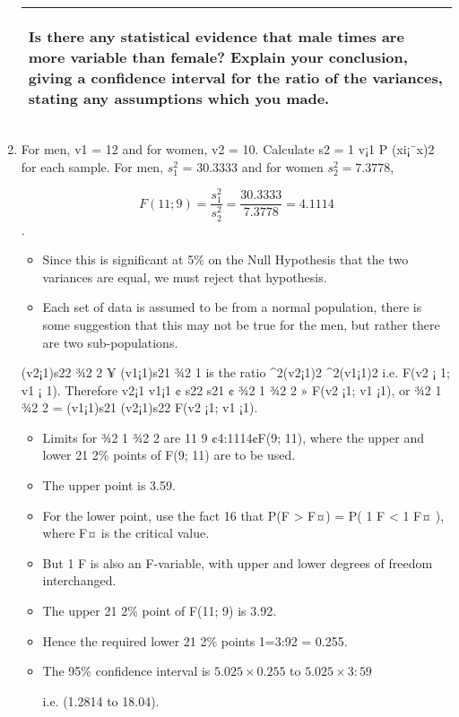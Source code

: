 \documentclass[a4paper,12pt]{article}
\begin{document}
\begin{enumerate}
\begin{table}[ht!]
\begin{tabular}{|p{15cm}|}
\begin{center}
\end{center}
Is there any statistical evidence that male times are more variable than female? Explain
your conclusion, giving a confidence interval for the ratio of the variances, stating any
assumptions which you made.
\\ \hline
      
\end{tabular}
    
\end{table}
\item  For men, v1 = 12 and for women, v2 = 10. Calculate s2 = 1
v¡1
P
(xi¡¯x)2 for
each sample. For men, $s^2_1$
= 30.3333 and for women $s^2_2
= 7.3778$, 

\[ F(11;9) = \frac{s^2_1}{s^2_2}  = \frac{30.3333}{7.3778} 
= 4.1114\]. 

\begin{itemize}
    \item Since this is significant at 5\% on the Null Hypothesis that the
two variances are equal, we must reject that hypothesis.
\item Each set of data is
assumed to be from a normal population, there is some suggestion that this
may not be true for the men, but rather there are two sub-populations.
\end{itemize}

(v2¡1)s22 ¾2
2
¥ (v1¡1)s21
¾2
1
is the ratio \chi^2(v2¡1)2
\chi^2(v1¡1)2
i.e. F(v2 ¡ 1; v1 ¡ 1). Therefore
v2¡1
v1¡1 ¢ s22
s21
¢ ¾2
1
¾2
2
» F(v2 ¡1; v1 ¡1), or ¾2
1
¾2
2
= (v1¡1)s21
(v2¡1)s22
F(v2 ¡1; v1 ¡1). 
\begin{itemize}
    \item Limits for
¾2
1
¾2
2
are 11
9 ¢4:1114¢F(9; 11), where the upper and lower 21
2\% points of F(9; 11)
are to be used. 
\item The upper point is 3.59. 
\item For the lower point, use the fact
16
that P(F > F¤) = P( 1
F < 1
F¤ ), where F¤ is the critical value.
\item But 1
F is also
an F-variable, with upper and lower degrees of freedom interchanged. \item The
upper 21
2\% point of F(11; 9) is 3.92.
\item Hence the required lower 21
2\% points
1=3:92 = 0.255. 
\item The 95\% confidence interval is $5.025\times 0.255$ to $5.025\times 3:59$

i.e. (1.2814 to 18.04).
\end{itemize}

\end{enumerate}
\end{document}
